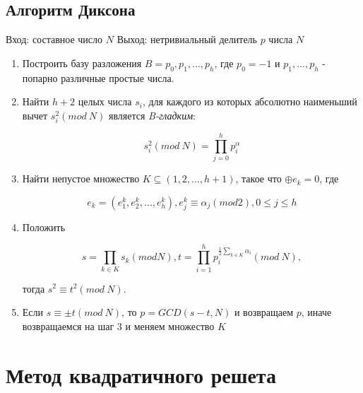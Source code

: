   \subsection{Алгоритм Диксона}
  Вход: составное число $N$
  Выход: нетривиальный делитель $p$ числа $N$
  
    \begin{enumerate}
     \item Построить базу разложения $B = {p_{0}, p_{1}, \dots, p_{h}}$, 
     где $p_{0} = -1$ и $p_{1}, \dots, p_{h}$ - попарно различные простые числа.
     \item Найти $h + 2$ целых числа $s_{i}$, для каждого из которых абсолютно наименьший вычет
     $s_{i}^{2}(mod \: N)$ является \textit{B-гладким}:
     
	\begin{equation} \label{eq:prime-fact-si}
	  s_{i}^{2}(mod \: N) = \prod_{j=0}^{h}{p_i^\alpha}
	\end{equation}
     
     \item Найти непустое множество $K \subseteq (1, 2, \dots, h+1)$, такое что $\oplus e_{k} = 0$, где 
     
	\begin{equation} \label{eq:prime-fact-ek}
	  e_k = (e_1^k, e_2^k, \dots, e_h^k), e_j^k \equiv \alpha_j(mod 2), 0 \le j \le h
	\end{equation}
     
     \item Положить 
     
	\begin{equation} \label{eq:prime-fact-sprod}
	  s = \prod_{k \in K}{s_k(mod N)}, t = \prod_{i=1}^{h}{p_{i}^{\frac{1}{2} \sum_{k \in K}{\alpha_i}}(mod \: N)},
	\end{equation}
     
     тогда $s^{2} \equiv t^{2}(mod \: N)$.
     \item Если $s \equiv \pm t(mod \: N)$, то $p = GCD(s - t, N)$ и возвращаем $p$, иначе возвращаемся на шаг 3 и меняем множество $K$
    \end{enumerate}
  

\section{Метод квадратичного решета}


